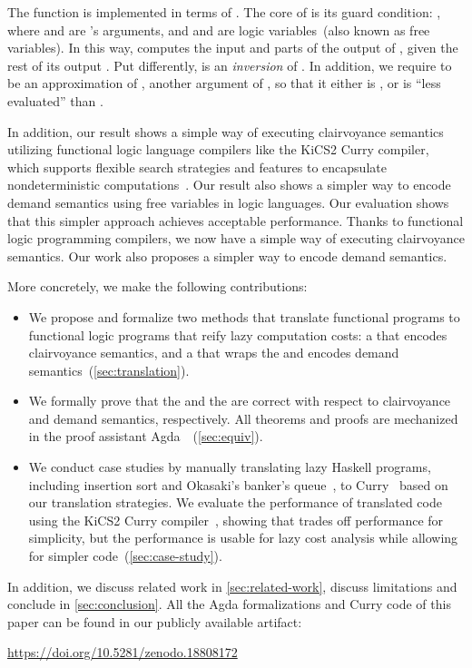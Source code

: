 The  function is implemented in terms of . The core of
 is its guard condition: , where
 and  are 's arguments, and  and 
are logic variables~(also known as free variables). In this way, 
computes the input  and parts of the output  of ,
given the rest of its output . Put differently,  is an
\emph{inversion} of . In addition, we require  to be an
approximation of , another argument of , so that it either
is , or is ``less evaluated'' than .

\ifextended
In addition, our result shows a simple way of executing clairvoyance semantics
utilizing functional logic language compilers like the KiCS2 Curry compiler,
which supports flexible search strategies and features to encapsulate
nondeterministic computations~\cite{kics2}. Our result also shows a simpler way
to encode demand semantics using free variables in logic languages. Our
evaluation shows that this simpler approach achieves acceptable performance.
\else
  Thanks to functional logic programming compilers, we now have a simple way of
  executing clairvoyance semantics. Our work also proposes a simpler way to
  encode demand semantics.
\fi

More concretely, we make the following contributions:

\begin{itemize}
\item We propose and formalize two methods that translate
  functional programs to functional logic programs that reify lazy computation
  costs: a \transCname{} that encodes clairvoyance semantics, and a
  \transDname{} that wraps the \transCname{} and encodes demand
  semantics~(\cref{sec:translation}).
\item We formally prove that the \transCname{} and the \transDname{} are correct
  with respect to clairvoyance and demand semantics, respectively. All theorems
  and proofs are mechanized in the proof assistant
  Agda~\cite{DBLP:conf/tldi/Norell09}~(\cref{sec:equiv}).
  \item We conduct case studies by manually translating lazy Haskell programs,
        including insertion sort and Okasaki's banker's
        queue~\cite{purely-functional}, to Curry~\cite{curry-lang} based on our
        translation strategies. We evaluate the performance of translated code
        using the KiCS2 Curry compiler~\cite{kics2}, showing that \transDname{}
        trades off performance for simplicity, but the performance is usable for
        lazy cost analysis while allowing for simpler
        code~(\cref{sec:case-study}).
\end{itemize}

In addition, we discuss related work in \cref{sec:related-work}, discuss
limitations and conclude in \cref{sec:conclusion}. All the Agda formalizations
and Curry code of this paper can be found in our publicly available artifact:

\begin{center}
\url{https://doi.org/10.5281/zenodo.18808172}
\end{center}
